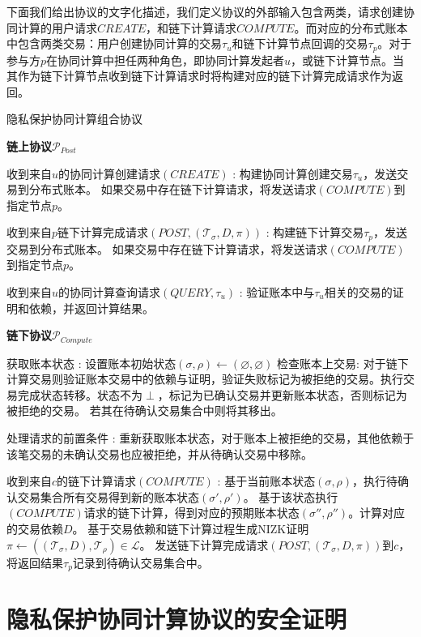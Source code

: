 下面我们给出协议的文字化描述，我们定义协议的外部输入包含两类，请求创建协同计算的用户请求$CREATE$，和链下计算请求$COMPUTE$。而对应的分布式账本中包含两类交易：用户创建协同计算的交易$\tau_u$和链下计算节点回调的交易$\tau_p$。对于参与方$p$在协同计算中担任两种角色，即协同计算发起者$u$，或链下计算节点。当其作为链下计算节点收到链下计算请求时将构建对应的链下计算完成请求作为返回。
\begin{breakablealgorithm}
    \caption{隐私保护协同计算组合协议}
    \label{alg:ch4-10}
    \begin{algorithmic} 
        \item [\textbf{链上协议$\mathcal{P}_{Post}$}] 
        \item[收到来自$u$的协同计算创建请求$(CREATE)$]:
        \STATE 构建协同计算创建交易$\tau_u$，发送交易到分布式账本。
        \STATE 如果交易中存在链下计算请求，将发送请求$(COMPUTE)$到指定节点$p$。
        \item[收到来自$p$链下计算完成请求$(POST, (\mathcal{T}_\sigma, D, \pi))$]:
        \STATE 构建链下计算交易$\tau_p$，发送交易到分布式账本。 
        \STATE 如果交易中存在链下计算请求，将发送请求$(COMPUTE)$到指定节点$p$。
        \item[收到来自$u$的协同计算查询请求$(QUERY, \tau_u)$]:
        \STATE 验证账本中与$\tau_u$相关的交易的证明和依赖，并返回计算结果。

        \noindent\hrulefill
        \item [\textbf{链下协议$\mathcal{P}_{Compute}$}] 
        \item[获取账本状态]: 
        \STATE 设置账本初始状态$(\sigma, \rho) \leftarrow (\varnothing, \varnothing)$
        \STATE 检查账本上交易: 对于链下计算交易则验证账本交易中的依赖与证明，验证失败标记为被拒绝的交易。执行交易完成状态转移。状态不为$\perp$，标记为已确认交易并更新账本状态，否则标记为被拒绝的交易。
        \STATE 若其在待确认交易集合中则将其移出。
        \item[处理请求的前置条件]: 
        \STATE 重新获取账本状态，对于账本上被拒绝的交易，其他依赖于该笔交易的未确认交易也应被拒绝，并从待确认交易中移除。
        \item[收到来自$c$的链下计算请求$(COMPUTE)$]:
        \STATE 基于当前账本状态$(\sigma, \rho)$，执行待确认交易集合所有交易得到新的账本状态$(\sigma', \rho')$。
        \STATE 基于该状态执行$(COMPUTE)$请求的链下计算，得到对应的预期账本状态$(\sigma'', \rho'')$。计算对应的交易依赖$D$。
        \STATE 基于交易依赖和链下计算过程生成NIZK证明$\pi \leftarrow ((\mathcal{T}_\sigma, D), \mathcal{T}_\rho) \in \mathcal{L}$。
        \STATE 发送链下计算完成请求$(POST,(\mathcal{T}_\sigma, D, \pi))$到$c$，将返回结果$\tau_p$记录到待确认交易集合中。
    \end{algorithmic}
\end{breakablealgorithm}

\section{隐私保护协同计算协议的安全证明}
